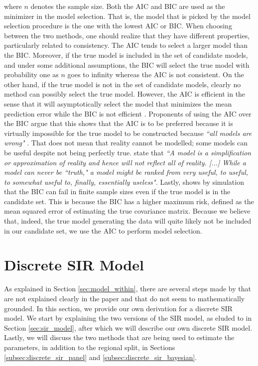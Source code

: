 \documentclass[12pt]{article}
\begin{document}
	where $n$ denotes the sample size. Both the AIC and BIC are used as the minimizer in the model selection. That is, the model that is picked by the model selection procedure is the one with the lowest AIC or BIC. When choosing between the two methods, one should realize that they have different properties, particularly related to consistency. The AIC tends to select a larger model than the BIC. Moreover, if the true model is included in the set of candidate models, and under some additional assumptions, the BIC will select the true model with probability one as $n$ goes to infinity whereas the AIC is not consistent. On the other hand, if the true model is not in the set of candidate models, clearly no method can possibly select the true model. However, the AIC is efficient in the sense that it will asymptotically select the model that minimizes the mean prediction error while the BIC is not efficient \parencite{vrieze2012model}. Proponents of using the AIC over the BIC argue that this shows that the AIC is to be preferred because it is virtually impossible for the true model to be constructed because \textit{``all models are wrong"} \parencite{box1976science}. That does not mean that reality cannot be modelled; some models can be useful despite not being perfectly true. \textcite{burnham2002practical} state that \textit{``A model is a simplification or approximation of reality and hence will not reflect all of reality. [...] While a model can never be ``truth," a model might be ranked from very useful, to useful, to somewhat useful to, finally, essentially useless".} Lastly, \textcite{vrieze2012model} shows by simulation that the BIC can fail in finite sample sizes even if the true model is in the candidate set. This is because the BIC has a higher maximum risk, defined as the mean squared error of estimating the true covariance matrix. Because we believe that, indeed, the true model generating the data will quite likely not be included in our candidate set, we use the AIC to perform model selection.
	
	\section{Discrete SIR Model}\label{sec:discrete_sir_model}
	As explained in Section \ref{sec:model_within}, there are several steps made by \textcite{adda2016economic} that are not explained clearly in the paper and that do not seem to mathematically grounded. In this section, we provide our own derivation for a discrete SIR model. We start by explaining the two versions of the SIR model, as eluded to in Section \ref{sec:sir_model}, after which we will describe our own discrete SIR model. Lastly, we will discuss the two methods that are being used to estimate the parameters, in addition to the regional split, in Sections \ref{subsec:discrete_sir_panel} and \ref{subsec:discrete_sir_bayesian}. \\
	
\end{document}
